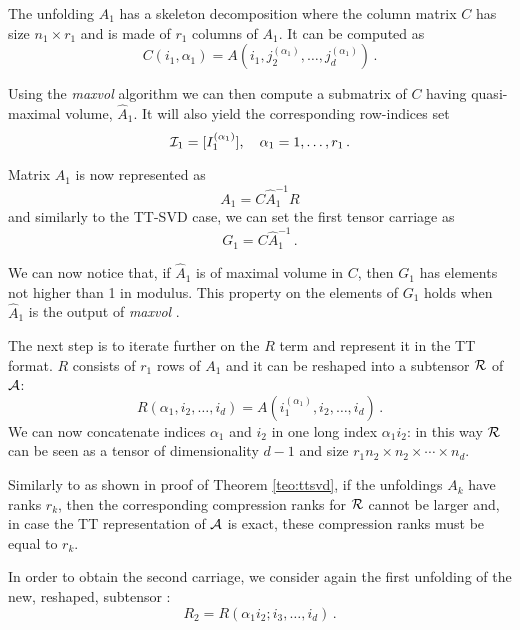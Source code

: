 The unfolding $A_1$ has a skeleton decomposition where the column matrix $C$ has size $n_1 \times r_1$ and is made of $r_1$ columns of $A_1$.
It can be computed as
\begin{equation*}
  C(i_1,\alpha_1) = A(i_1,j_2^{(\alpha_1)},\ldots,j_d^{(\alpha_1)})\, .
\end{equation*}

Using the \emph{maxvol} algorithm we can then compute a submatrix of $C$ having quasi-maximal volume, $\hat{A}_1$. It will also yield the corresponding row-indices set
\begin{equation*}
  \mathcal{I}_1 = [I_1^{(\alpha_1)}], \quad \alpha_1 = 1,\ldots,r_1\, .
\end{equation*}

Matrix $A_1$ is now represented as
\begin{equation*}
  A_1 = C\hat{A}_1^{-1}R
\end{equation*}
and similarly to the TT-SVD case, we can set the first tensor carriage as
\begin{equation*}
  G_1 = C\hat{A}_1^{-1}\, .
\end{equation*}

We can now notice that, if $\hat{A}_1$ is of maximal volume in $C$, then $G_1$ has elements not higher than 1 in modulus. This property on the elements of $G_1$ holds when $\hat{A}_1$ is the output of \emph{maxvol} \cite{tyrtyshnikov2000incomplete,goreinov2010find}.

The next step is to iterate further on the $R$ term and represent it in the TT format. $R$ consists of $r_1$ rows of $A_1$ and it can be reshaped into a subtensor $\mathcal{R}$ of $\mathcal{A}$:
\begin{equation*}
  R(\alpha_1,i_2,\ldots,i_d) = A(i_1^{(\alpha_1)},i_2,\ldots,i_d)\, .
\end{equation*}
We can now concatenate indices $\alpha_1$ and $i_2$ in one long index $\alpha_1i_2$: in this way $\mathcal{R}$ can be seen as a tensor of dimensionality $d-1$ and size $r_1n_2 \times n_2 \times \cdots \times n_d$.

Similarly to as shown in proof of Theorem \ref{teo:ttsvd}, if the unfoldings $A_k$ have ranks $r_k$, then the corresponding compression ranks for $\mathcal{R}$ cannot be larger and, in case the TT representation of $\mathcal{A}$ is exact, these compression ranks must be equal to $r_k$.

In order to obtain the second carriage, we consider again the first unfolding of the new, reshaped, subtensor :
\begin{equation*}
  R_2 = R(\alpha_1i_2;i_3,\ldots,i_d)\, .
\end{equation*}

